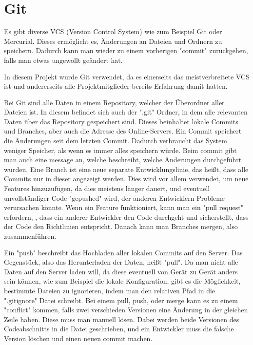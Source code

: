 \renewcommand{\kapitelautor}{Autor: Felix Zwickelstorfer}

\section{Git}\label{sec:git}

Es gibt diverse VCS (Version Control System) wie zum Beispiel Git oder Mercurial.\cite{}
Dieses ermöglicht es, Änderungen an Dateien und Ordnern zu speichern.
Dadurch kann man wieder zu einem vorherigen "commit" zurückgehen, falls man etwas ungewollt geändert hat.

In diesem Projekt wurde Git verwendet, da es einerseits das meistverbreitete VCS ist und andererseits alle Projektmitglieder bereits Erfahrung damit hatten.

Bei Git sind alle Daten in einem Repository, welcher der Überordner aller Dateien ist.
In diesem befindet sich auch der ".git" Ordner, in dem alle relevanten Daten über das Repository gespeichert sind.
Dieses beinhaltet \zB lokale Commits und Branches, aber auch die Adresse des Online-Servers.
Ein Commit speichert die Änderungen seit dem letzten Commit.
Dadurch verbraucht das System weniger Speicher, als wenn es immer alles speichern würde.
Beim commit gibt man auch eine message an, welche beschreibt, welche Änderungen durchgeführt wurden.
Eine Branch ist eine neue separate Entwicklungslinie, das heißt, dass alle Commits nur in dieser angezeigt werden.
Dies wird vor allem verwendet, um neue Features hinzuzufügen, da dies meistens länger dauert, und eventuell unvollständiger Code "gepushed" wird,
der anderen Entwicklern Probleme verursachen könnte.
Wenn ein Feature funktioniert, kann man ein "pull request" erfordern, \dah, dass ein anderer Entwickler den Code durchgeht und sicherstellt,
dass der Code den Richtlinien entspricht.
Danach kann man Branches mergen, also zusammenführen.

Ein "push" beschreibt das Hochladen aller lokalen Commits auf den Server.
Das Gegenstück, also das Herunterladen der Daten, heißt "pull".
Da man nicht alle Daten auf den Server laden will, da diese eventuell von Gerät zu Gerät anders sein können, wie zum Beispiel die lokale Konfiguration,
gibt es die Möglichkeit, bestimmte Dateien zu ignorieren, indem man den relativen Pfad in die ".gitignore" Datei schreibt.
Bei einem pull, push, oder merge kann es zu einem "conflict" kommen, falls zwei verschieden Versionen eine Änderung in der gleichen Zeile haben.
Diese muss man manuell lösen.
Dabei werden beide Versionen des Codeabschnitts in die Datei geschrieben, und ein Entwickler muss die falsche Version löschen und einen neuen commit machen.\cite{gitHomePage}


